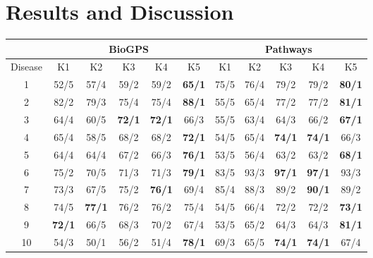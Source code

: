 \documentclass{esannV2}
\begin{document}
\section{Results and Discussion}
\label{results_discussion}
\begin{table}[H]
\label{results}
\centering
\setlength{\tabcolsep}{1.27mm}
\begin{tabular}{|c|c|c|c|c|c|c|c|c|c|c|}
\hline
         & \multicolumn{5}{c|}{\textbf{BioGPS}} & \multicolumn{5}{c|}{\textbf{Pathways}}\\
 \hline
Disease & K1 & K2 & K3 & K4 & K5 & K1 & K2 & K3 & K4 & K5\\
 \hline
 1 & 52/5 & 57/4 & 59/2 & 59/2 & \textbf{65/1}
 & 75/5 & 76/4 & 79/2 & 79/2 & \textbf{80/1} \\[0.5ex]
 
 2	& 82/2 & 79/3 & 75/4 & 75/4 & \textbf{88/1} 
 & 55/5 & 65/4 & 77/2 & 77/2 & \textbf{81/1} \\[0.5ex]
 
 3	& 64/4 & 60/5 & \textbf{72/1} & \textbf{72/1} & 66/3
 & 55/5 & 63/4 & 64/3 & 66/2 & \textbf{67/1} \\[0.5ex]
 
 
 4	& 65/4 & 58/5 & 68/2 & 68/2 & \textbf{72/1 }
 & 54/5 & 65/4 & \textbf{74/1} & \textbf{74/1} & 66/3 \\[0.5ex]
 
 
 5	& 64/4 & 64/4 & 67/2 & 66/3 & \textbf{76/1}
 & 53/5 & 56/4 & 63/2 & 63/2 & \textbf{68/1} \\[0.5ex]
 
 6	& 75/2 & 70/5 & 71/3 & 71/3 & \textbf{79/1} 
 & 83/5 & 93/3 & \textbf{97/1} & \textbf{97/1} & 93/3 \\[0.5ex]
 
 7		& 73/3 & 67/5 & 75/2 & \textbf{76/1} & 69/4
 & 85/4 & 88/3 & 89/2 & \textbf{90/1} & 89/2 \\[0.5ex]
 
 8		& 74/5 & \textbf{77/1} & 76/2 & 76/2 & 75/4
 & 54/5 & 66/4 & 72/2 & 72/2 & \textbf{73/1 }\\[0.5ex]
 
 9	 & \textbf{72/1} & 66/5 & 68/3 & 70/2 & 67/4
 & 53/5 & 65/2 & 64/3 & 64/3 & \textbf{81/1} \\[0.5ex]
 
 10			& 54/3 & 50/1 & 56/2 & 51/4 & \textbf{78/1 }
 & 69/3 & 65/5 & \textbf{74/1} & \textbf{74/1} & 67/4 \\ [0.5ex]
 

\end{tabular}
\end{table}
\end{document}
